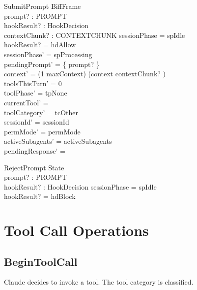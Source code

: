 \documentclass[a4paper,10pt,fleqn]{article}
\begin{document}
\begin{schema}{SubmitPrompt}
  BiffFrame \\
  prompt? : PROMPT \\
  hookResult? : HookDecision \\
  contextChunk? : CONTEXTCHUNK
  \where
  sessionPhase = spIdle \\
  hookResult? = hdAllow \\
  sessionPhase' = spProcessing \\
  pendingPrompt' = \{ prompt? \} \\
  context' = (1 \upto maxContext) \dres (context \cat \langle contextChunk? \rangle) \\
  toolsThisTurn' = 0 \\
  toolPhase' = tpNone \\
  currentTool' = \emptyset \\
  toolCategory' = tcOther \\
  sessionId' = sessionId \\
  permMode' = permMode \\
  activeSubagents' = activeSubagents \\
  pendingResponse' = \emptyset
\end{schema}

\begin{schema}{RejectPrompt}
  \Xi State \\
  prompt? : PROMPT \\
  hookResult? : HookDecision
  \where
  sessionPhase = spIdle \\
  hookResult? = hdBlock
\end{schema}

\section{Tool Call Operations}

\subsection{BeginToolCall}

Claude decides to invoke a tool. The tool category is classified.
\end{document}

